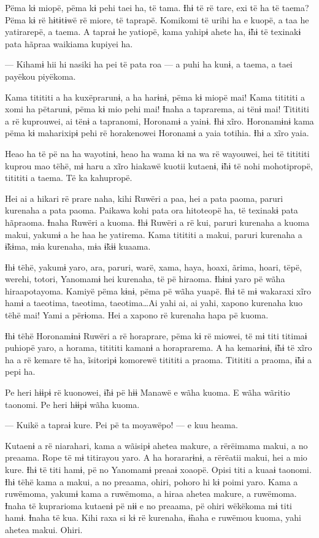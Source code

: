  

 

Pëma kɨ miopë, pëma kɨ pehi taei ha, të tama. Ɨhɨ të rë tare, exi të ha
të taema? Pëma kɨ rë hɨtɨtɨwë rë miore, të taprapë. Komikomi të urihi ha
e kuopë, a taa he yatirarepë, a taema. A tapraɨ he yatiopë, kama yahipɨ
ahete ha, ɨ̃hɨ të texinakɨ pata hãpraa waikiama kupiyei ha. 

— Kihamɨ hii hi nasiki ha pei të pata roa --- a puhi ha kunɨ, a taema, a
taei payëkou piyëkoma. 

Kama titititi a ha kuxëprarunɨ, a ha harɨnɨ, pëma kɨ miopë mai! Kama
titititi a xomi ha pëtarunɨ, pëma kɨ mio pehi mai! Ɨnaha a taprarema, ai
tënɨ mai! Titititi a rë kuprouwei, ai tënɨ a tapranomi, Horonamɨ a
yainɨ. Ɨhɨ xĩro. Horonamɨnɨ kama pëma kɨ maharixipɨ pehi rë horakenowei
Horonamɨ a yaia totihia. Ɨhɨ a xĩro yaia. 

Heao ha të pë na ha wayotinɨ, heao ha wama kɨ na wa rë wayouwei, hei të
titititi kuprou mao tëhë, mɨ haru a xĩro hiakawë kuotii kutaenɨ, ɨ̃hɨ të
nohi mohotipropë, titititi a taema. Të ka kahupropë. 

Hei ai a hikari rë prare naha, kihi Ruwëri a paa, hei a pata paoma,
paruri kurenaha a pata paoma. Paikawa kohi pata ora hitoteopë ha, të
texinakɨ pata hãpraoma. Ɨnaha Ruwëri a kuoma. Ɨhɨ Ruwëri a rë kui,
paruri kurenaha a kuoma makui, yakumɨ a he haa he yatirema. Kama
titititi a makui, paruri kurenaha a ɨ̃kɨma, mɨa kurenaha, mɨa ɨ̃kɨɨ
kuaama. 

Ɨhɨ tëhë, yakumɨ yaro, ara, paruri, warë, xama, haya, hoaxi, ãrima,
hoari, tëpë, werehi, totori, Yanomamɨ hei kurenaha, të pë hiraoma. Ɨhɨnɨ
yaro pë wãha hiraapotayoma. Kamiyë pëma kɨnɨ, pëma pë wãha yuapë. Ɨhɨ të
mɨ wakaraxi xĩro hamɨ a taeotima, taeotima, taeotima…Ai yahi ai,
ai yahi, xapono kurenaha kuo tëhë mai! Yami a përɨoma. Hei a xapono rë
kurenaha hapa pë kuoma. 

Ɨhɨ tëhë Horonamɨnɨ Ruwëri a rë horaprare, pëma kɨ rë miowei, të mɨ titi
titimaɨ puhiopë yaro, a horama, titititi kamanɨ a horaprarema. A ha
kemarɨnɨ, ɨ̃hɨ të xĩro ha a rë kemare të ha, ĩsitoripɨ komorewë titititi
a praoma. Titititi a praoma, ɨ̃hɨ a pepi ha. 

Pe heri hɨɨpɨ rë kuonowei, ɨ̃hɨ pë hɨɨ Manawë e wãha kuoma. E wãha
wãritio taonomi. Pe heri hɨɨpɨ wãha kuoma. 

— Kuikë a tapraɨ kure. Pei pë ta moyawëpo! --- e kuu heama. 

Kutaenɨ a rë niarahari, kama a wãisipɨ ahetea makure, a rërëimama makui,
a no preaama. Rope të mɨ titirayou yaro. A ha horararɨnɨ, a rërëatii
makui, hei a mio kure. Ɨhɨ të titi hamɨ, pë no Yanomamɨ preaaɨ xoaopë.
Opisi titi a kuaaɨ taonomi. Ɨhɨ tëhë kama a makui, a no preaama, ohiri,
pohoro hi kɨ poimi yaro. Kama a ruwëmoma, yakumɨ kama a ruwëmoma, a
hiraa ahetea makure, a ruwëmoma. Ɨnaha të kuprarioma kutaenɨ pë nɨɨ e no
preaama, pë ohiri wëkëkoma mɨ titi hamɨ. Ɨnaha të kua. Kihi raxa si kɨ
rë kurenaha, ɨ̃naha e ruwëmou kuoma, yahi ahetea makui. Ohiri. 

